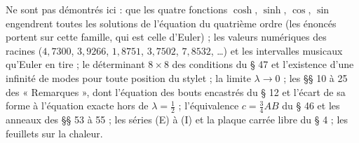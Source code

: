 Ne sont pas démontrés ici : que les quatre fonctions $\cosh$, $\sinh$, $\cos$, $\sin$ engendrent toutes les solutions de l'équation du quatrième ordre (les énoncés portent sur cette famille, qui est celle d'Euler) ; les valeurs numériques des racines ($4{,}7300$, $3{,}9266$, $1{,}8751$, $3{,}7502$, $7{,}8532$, \dots) et les intervalles musicaux qu'Euler en tire ; le déterminant $8 \times 8$ des conditions du § 47 et l'existence d'une infinité de modes pour toute position du stylet ; la limite $\lambda \to 0$ ; les §§ 10 à 25 des « Remarques », dont l'équation des bouts encastrés du § 12 et l'écart de sa forme à l'équation exacte hors de $\lambda = \frac12$ ; l'équivalence $c = \frac34 AB$ du § 46 et les anneaux des §§ 53 à 55 ; les séries (E) à (I) et la plaque carrée libre du § 4 ; les feuillets sur la chaleur.
